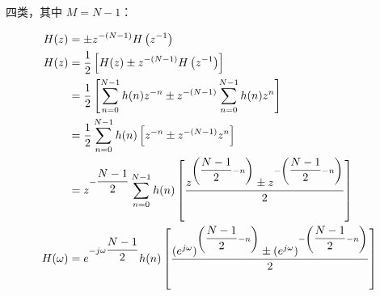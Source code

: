 \documentclass[cn,11pt,chinese,black,simple]{elegantbook}
\begin{document}
四类，其中 \(M = N - 1\)：

\[
\begin{aligned}
H(z) &=\pm z^{-(N-1)} H\left(z^{-1}\right) \\
H(z) &=\dfrac{1}{2}\left[H(z) \pm z^{-(N-1)} H\left(z^{-1}\right)\right] \\
&=\dfrac{1}{2}\left[\displaystyle\sum_{n=0}^{N-1} h(n) z^{-n} \pm z^{-(N-1)} \displaystyle\sum_{n=0}^{N-1} h(n) z^{n}\right] \\
&=\dfrac{1}{2} \displaystyle\sum_{n=0}^{N-1} h(n)\left[z^{-n} \pm z^{-(N-1)} z^{n}\right] \\
&=z^{-\dfrac{N-1}{2}} \displaystyle\sum_{n=0}^{N-1} h(n)\left[\dfrac{z^{\left(\dfrac{N-1}{2}-n\right)} \pm z^{-\left(\dfrac{N-1}{2}-n\right)}}{2}\right] \\
H(\omega) &= e^{-j \omega \dfrac{N-1}{2}}  h(n)\left[\dfrac{(e^{j\omega})^{\left(\dfrac{N-1}{2}-n\right)} \pm (e^{j\omega})^{-\left(\dfrac{N-1}{2}-n\right)}}{2}\right]
\end{aligned}
\]
\end{document}
